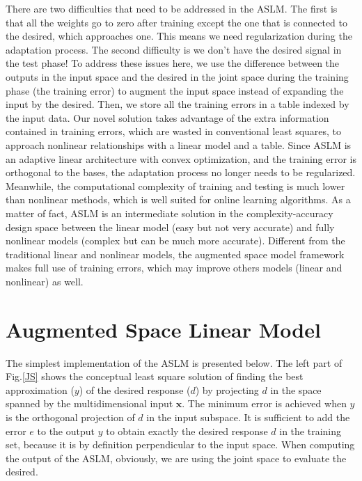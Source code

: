 \documentclass{article}
\begin{document}
There are two difficulties that need to be addressed in the ASLM. The first is that all the weights go to zero after training except the one that is connected to the desired,  which approaches one. This means we need regularization during the adaptation process. The second difficulty is we don't have the desired signal in the test phase! To address these issues here, we use the difference between the outputs in the input space and the desired in the joint space during the training phase (the training error) to augment the input space instead of expanding the input by the desired. Then, we store all the training errors in a table indexed by the input data. Our novel solution takes advantage of the extra information contained in training errors, which are wasted in conventional least squares, to approach nonlinear relationships with a linear model and a table. Since ASLM is an adaptive linear architecture with convex optimization, and the training error is orthogonal to the bases, the adaptation process no longer needs to be regularized. Meanwhile, the computational complexity of training and testing is much lower than nonlinear methods, which is well suited for online learning algorithms. As a matter of fact, ASLM is an intermediate solution in the complexity-accuracy design space between the linear model (easy but not very accurate) and fully nonlinear models (complex but can be much more accurate). Different from the traditional linear and nonlinear models, the augmented space model framework makes full use of training errors, which may improve others models (linear and nonlinear) as well. 

\section{Augmented Space Linear Model}
The simplest implementation of the ASLM is presented below. The left part of Fig.\ref*{JS} shows the conceptual least square solution of finding the best approximation ($ y $) of the desired response ($ d $) by projecting $ d $ in the space spanned by the multidimensional input $ \textbf{x} $. The minimum error is achieved when $ y $ is the orthogonal projection of $ d $ in the input subspace. It is sufficient to add the error $ e $ to the output $ y $ to obtain exactly the desired response $ d $ in the training set, because it is by definition perpendicular to the input space. When computing the output of the ASLM, obviously, we are using the joint space to evaluate the desired.
\end{document}
